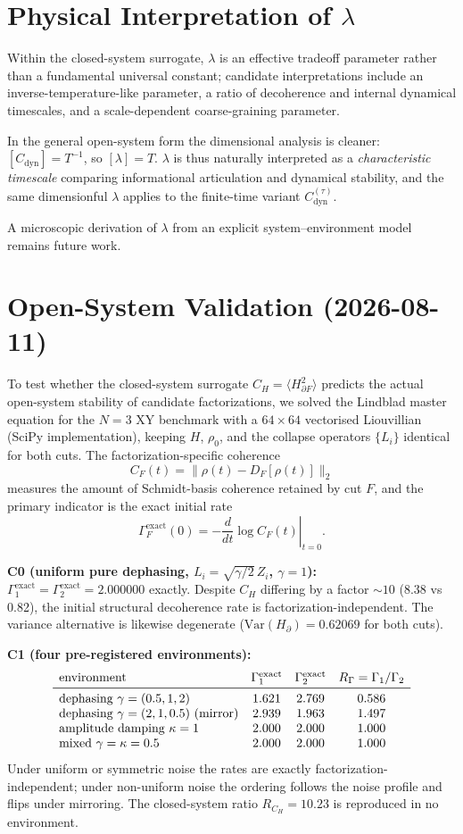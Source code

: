 \documentclass[11pt]{article}
\begin{document}
\section{Physical Interpretation of $\lambda$}
Within the closed-system surrogate, $\lambda$ is an effective tradeoff parameter rather than a fundamental universal constant; candidate interpretations include an inverse-temperature-like parameter, a ratio of decoherence and internal dynamical timescales, and a scale-dependent coarse-graining parameter.

In the general open-system form the dimensional analysis is cleaner: $[C_{\mathrm{dyn}}]=T^{-1}$, so $[\lambda]=T$. $\lambda$ is thus naturally interpreted as a \emph{characteristic timescale} comparing informational articulation and dynamical stability, and the same dimensionful $\lambda$ applies to the finite-time variant $C_{\mathrm{dyn}}^{(\tau)}$.

A microscopic derivation of $\lambda$ from an explicit system--environment model remains future work.

\section{Open-System Validation (2026-08-11)}
To test whether the closed-system surrogate $C_H=\langle H_{\partial F}^2\rangle$ predicts the actual open-system stability of candidate factorizations, we solved the Lindblad master equation for the $N=3$ XY benchmark with a $64\times64$ vectorised Liouvillian (SciPy implementation), keeping $H$, $\rho_0$, and the collapse operators $\{L_i\}$ identical for both cuts. The factorization-specific coherence
\[
C_F(t)=\|\rho(t)-D_F[\rho(t)]\|_2
\]
measures the amount of Schmidt-basis coherence retained by cut $F$, and the primary indicator is the exact initial rate
\[
\Gamma_F^{\mathrm{exact}}(0)=-\left.\frac{d}{dt}\log C_F(t)\right|_{t=0}.
\]

\textbf{C0 (uniform pure dephasing, $L_i=\sqrt{\gamma/2}\,Z_i$, $\gamma=1$):}
$\Gamma_1^{\mathrm{exact}}=\Gamma_2^{\mathrm{exact}}=2.000000$ exactly. Despite $C_H$ differing by a factor $\sim10$ (8.38 vs 0.82), the initial structural decoherence rate is factorization-independent. The variance alternative is likewise degenerate ($\mathrm{Var}(H_{\partial})=0.62069$ for both cuts).

\textbf{C1 (four pre-registered environments):}
\[
\begin{array}{lccc}
\text{environment} & \Gamma_1^{\mathrm{exact}} & \Gamma_2^{\mathrm{exact}} & R_\Gamma=\Gamma_1/\Gamma_2 \\ \midrule
\text{dephasing } \gamma=(0.5,1,2) & 1.621 & 2.769 & 0.586 \\
\text{dephasing } \gamma=(2,1,0.5)\ \text{(mirror)} & 2.939 & 1.963 & 1.497 \\
\text{amplitude damping } \kappa=1 & 2.000 & 2.000 & 1.000 \\
\text{mixed } \gamma=\kappa=0.5 & 2.000 & 2.000 & 1.000
\end{array}
\]
Under uniform or symmetric noise the rates are exactly factorization-independent; under non-uniform noise the ordering follows the noise profile and flips under mirroring. The closed-system ratio $R_{C_H}=10.23$ is reproduced in no environment.
\end{document}
